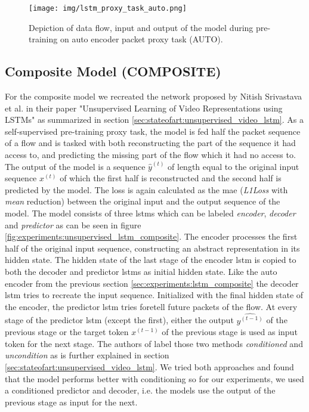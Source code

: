 \begin{figure}[h]
	\centering
	\texttt{[image: img/lstm\_proxy\_task\_auto.png]}
	\caption{Depiction of data flow, input and output of the model during pre-training on auto encoder packet proxy task (AUTO).}
	\label{fig:experiments:lstm_proxy_task_auto}
\end{figure}

\subsection{Composite Model (COMPOSITE)} \label{sec:experiments:lstm:composite}

For the composite model we recreated the network proposed by Nitish Srivastava et al. in their paper "Unsupervised Learning of Video Representations using LSTMs" \cite{unsupervised_learning_lstms} as summarized in section \ref{sec:stateofart:unsupervised_video_lstm}. As a self-supervised pre-training proxy task, the model is fed half the packet sequence of a flow and is tasked with both reconstructing the part of the sequence it had access to, and predicting the missing part of the flow which it had no access to. The output of the model is a sequence $\hat{y}^{(t)}$ of length equal to the original input sequence $x^{(t)}$ of which the first half is reconstructed and the second half is predicted by the model. The loss is again calculated as the \gls{mae} (\textit{L1Loss} with \textit{mean} reduction) between the original input and the output sequence of the model. The model consists of three \glspl{lstm} which can be labeled \textit{encoder}, \textit{decoder} and \textit{predictor} as can be seen in figure \ref{fig:experiments:unsupervised_lstm_composite}. The encoder processes the first half of the original input sequence, constructing an abstract representation in its hidden state. The hidden state of the last stage of the encoder \gls{lstm} is copied to both the decoder and predictor \glspl{lstm} as initial hidden state. Like the auto encoder from the previous section \ref{sec:experiments:lstm_composite} the decoder \gls{lstm} tries to recreate the input sequence. Initialized with the final hidden state of the encoder, the predictor \gls{lstm} tries foretell future packets of the flow. At every stage of the predictor \gls{lstm} (except the first), either the output $\hat{y^{(t-1)}}$ of the previous stage or the target token $x^{(t-1)}$ of the previous stage is used as input token for the next stage. The authors of \cite{unsupervised_learning_lstms} label those two methods \textit{conditioned} and \textit{uncondition} as is further explained in section \ref{sec:stateofart:unsupervised_video_lstm}. We tried both approaches and found that the model performs better with conditioning so for our experiments, we used a conditioned predictor and decoder, i.e. the models use the output of the previous stage as input for the next. 

